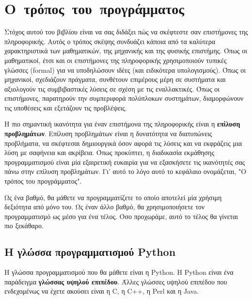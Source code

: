 \documentclass[10pt]{book}
\begin{document}
\normalsize


\begin{latexonly}

\tableofcontents


\end{latexonly}

\mainmatter


\chapter{Ο~τρόπος~του~προγράμματος}

Στόχος αυτού του βιβλίου είναι να σας διδάξει πώς να σκέφτεστε σαν επιστήμονες
της πληροφορικής. Αυτός ο τρόπος σκέψης συνδυάζει κάποια από τα καλύτερα χαρακτηριστικά των μαθηματικών, της μηχανικής και της φυσικής επιστήμης. Όπως οι μαθηματικοί, έτσι και οι επιστήμονες της πληροφορικής χρησιμοποιούν τυπικές γλώσσες (formal) για να υποδηλώσουν ιδέες (και ειδικότερα υπολογισμούς).  Όπως οι μηχανικοί, σχεδιάζουν πράγματα, συνθέτουν επιμέρους μέρη σε συστήματα και αξιολογούν τις συμβιβαστικές λύσεις σε σχέση με τις εναλλακτικές. Όπως οι επιστήμονες, παρατηρούν την συμπεριφορά πολύπλοκων συστημάτων, 
διαμορφώνουν τις υποθέσεις και εξετάζουν τις προβλέψεις.

Η πιο σημαντική ικανότητα για έναν επιστήμονα της πληροφορικής είναι η 
{\bf επίλυση προβλημάτων}. Επίλυση προβλημάτων είναι η δυνατότητα να διατυπώνεις προβλήματα, να σκέφτεσαι δημιουργικά όσον αφορά τις λύσεις και να εκφράζεις μια λύση με σαφήνεια και ακρίβεια. Όπως προκύπτει, η διαδικασία 
εκμάθησης προγραμματισμού είναι μία εξαιρετική ευκαιρία για να εξασκήσετε τις ικανότητές σας πάνω στην επίλυση προβλημάτων. Γι' αυτό το λόγο αυτό το κεφάλαιο ονομάζεται, "Ο τρόπος του προγράμματος".

Ως ένα βαθμό, θα μάθετε να προγραμματίζετε το οποίο αποτελεί μία χρήσιμη δεξιότητα από μόνο του. Ως έναν άλλο βαθμό, θα χρησιμοποιήσετε τον προγραμματισμό ως μέσο για ένα τέλος. Όσο προχωράμε, αυτό το τέλος θα γίνεται πιο ξεκάθαρο.


\section{Η γλώσσα προγραμματισμού Python}

Η γλώσσα προγραμματισμού που θα μάθετε είναι η Python. Η Python είναι ένα παράδειγμα {\bf γλώσσας υψηλού επιπέδου}. Άλλες γλώσσες υψηλού επιπέδου που ενδεχομένως να έχετε ακούσει είναι η C, η C++, η Perl και η Java.
\end{document}
